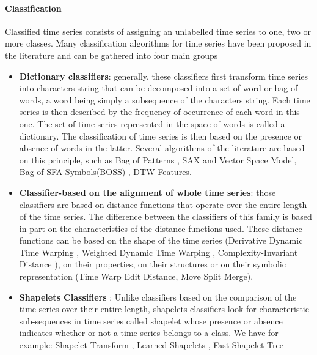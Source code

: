 \paragraph{Classification}
Classified time series consists of assigning an unlabelled time series to one, two or more classes. Many classification algorithms for time series have been proposed in the literature and can be gathered into four main groups
\begin{itemize}
\item \textbf{Dictionary classifiers}: generally, these classifiers first transform time series into characters string that can be decomposed into a set of word or bag of words, a word being simply a subsequence of the characters string. Each time series is then described by the frequency of occurrence of each word in this one. The set of time series represented in the space of words is called a dictionary. The classification of time series is then based on the presence or absence of words in the latter. Several algorithms of the literature are based on this principle, such as Bag of Patterns \cite{lin2012rotation},  SAX and Vector Space Model\cite{senin2013sax}, Bag of SFA Symbols(BOSS) \cite{schafer2015boss}, DTW Features\cite{kate2016using}.

\item \textbf{Classifier-based on the alignment of whole time series}: those classifiers are based on distance functions that operate over the entire length of the time series. The difference between the classifiers of this family is based in part on the characteristics of the distance functions used. These distance functions can be based on the shape of the time series (Derivative Dynamic Time Warping  \cite{keogh2001derivative}, Weighted Dynamic Time Warping  \cite{jeong2011weighted}, Complexity-Invariant Distance  \cite{batista2011complexity}), on their properties, on their structures or on their symbolic representation (Time Warp Edit Distance\cite{marteau2008time}, Move Split Merge\cite{stefan2013move}).

\item \textbf{Shapelets Classifiers} : Unlike classifiers based on the comparison of the time series over their entire length, shapelets classifiers look for characteristic sub-sequences in time series called shapelet whose presence or absence indicates whether or not a time series belongs to a class. We have for example: Shapelet Transform \cite{lines2012shapelet}, Learned Shapelets \cite{grabocka2014learning}, Fast Shapelet Tree \cite{rakthanmanon2013fast}


\end{itemize}
